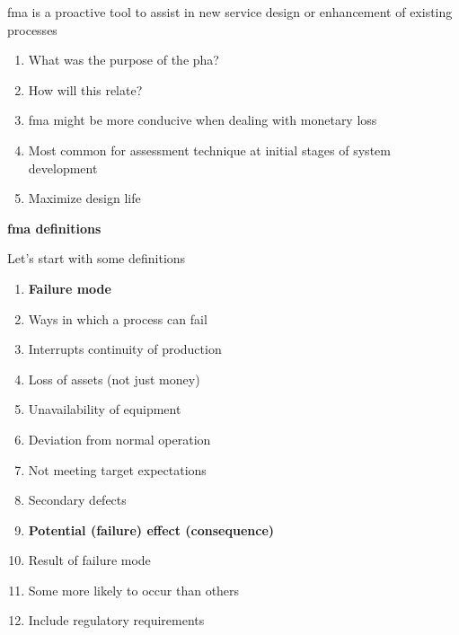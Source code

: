 \documentclass[aspectratio=1610,pdftex,dvipsnames,compress,xcolor={dvipsnames}]{beamer}
\newcommand{\acs}{\acrshort} %
\begin{document}
\begin{frame}{\acs{fma} is a proactive tool to assist in new service design or enhancement of existing processes}
    \begin{enumerate}[series=outerlist,topsep=0pt,itemsep=21pt,leftmargin=*,label=(\arabic*)]
        \item[]What was the purpose of the \acs{pha}?
        \item[]How will this relate?
        \item[]\acs{fma} might be more conducive when dealing with monetary loss
        \item[]Most common for assessment technique at initial stages of system development
        \item[]Maximize design life
    \end{enumerate}
\end{frame}


\begin{frame}[plain]{}
    \centering\LARGE\textbf{\acs{fma} definitions}
\end{frame}


\addtocounter{framenumber}{-1}
\begin{frame}{Let's start with some definitions}
    \begin{enumerate}[series=outerlist,topsep=0pt,itemsep=1pt,leftmargin=*,label=(\arabic*)]
        \item[]\textbf{Failure mode}
        \item[]Ways in which a process can fail  
        \item[]Interrupts continuity of production  
        \item[]Loss of assets (not just money)  
        \item[]Unavailability of equipment  
        \item[]Deviation from normal operation
        \item[]Not meeting target expectations 
        \item[]Secondary defects 
            \vspace{0.10in}
        \item[]\textbf{Potential (failure) effect (consequence)}
        \item[]Result of failure mode
        \item[]Some more likely to occur than others
        \item[]Include regulatory requirements
    \end{enumerate}
\end{frame}
\end{document}
